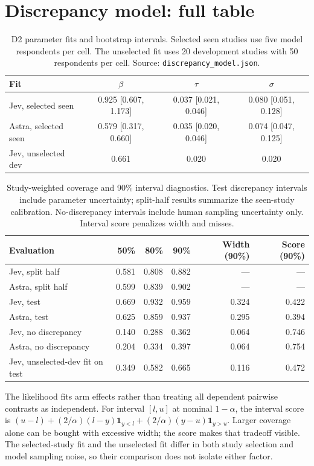 \documentclass[11pt]{article}
\begin{document}
\section{Discrepancy model: full table}\label{app:d2}
\begin{table}[!htbp]
\centering\small
\caption{D2 parameter fits and bootstrap intervals. Selected seen studies use five model respondents per cell. The unselected fit uses 20 development studies with 50 respondents per cell. Source: \texttt{discrepancy\_model.json}.}
\begin{tabular}{lccc}
\toprule
Fit & $\beta$ & $\tau$ & $\sigma$\\
\midrule
Jev, selected seen & 0.925 [0.607, 1.173] & 0.037 [0.021, 0.046] & 0.080 [0.051, 0.128]\\
Astra, selected seen & 0.579 [0.317, 0.660] & 0.035 [0.020, 0.046] & 0.074 [0.047, 0.125]\\
Jev, unselected dev & 0.661 & 0.020 & 0.020\\
\bottomrule
\end{tabular}
\end{table}
\begin{table}[!htbp]
\centering\small
\caption{Study-weighted coverage and 90\% interval diagnostics. Test discrepancy intervals include parameter uncertainty; split-half results summarize the seen-study calibration. No-discrepancy intervals include human sampling uncertainty only. Interval score penalizes width and misses.}
\begin{tabular}{lrrrrr}
\toprule
Evaluation & 50\% & 80\% & 90\% & Width (90\%) & Score (90\%)\\
\midrule
Jev, split half & 0.581 & 0.808 & 0.882 & --- & ---\\
Astra, split half & 0.599 & 0.839 & 0.902 & --- & ---\\
Jev, test & 0.669 & 0.932 & 0.959 & 0.324 & 0.422\\
Astra, test & 0.625 & 0.859 & 0.937 & 0.295 & 0.394\\
Jev, no discrepancy & 0.140 & 0.288 & 0.362 & 0.064 & 0.746\\
Astra, no discrepancy & 0.204 & 0.334 & 0.397 & 0.064 & 0.754\\
Jev, unselected-dev fit on test & 0.349 & 0.582 & 0.665 & 0.116 & 0.472\\
\bottomrule
\end{tabular}
\end{table}
The likelihood fits arm effects rather than treating all dependent pairwise contrasts as independent. For interval $[l,u]$ at nominal $1-\alpha$, the interval score is $(u-l)+(2/\alpha)(l-y)\mathbf{1}_{y<l}+(2/\alpha)(y-u)\mathbf{1}_{y>u}$. Larger coverage alone can be bought with excessive width; the score makes that tradeoff visible. The selected-study fit and the unselected fit differ in both study selection and model sampling noise, so their comparison does not isolate either factor.
\end{document}
